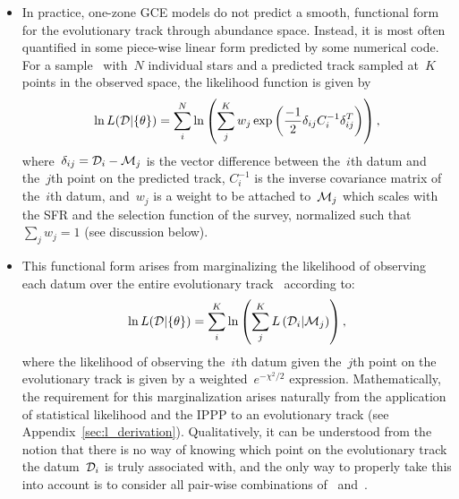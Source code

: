 \documentclass[ms.tex]{subfiles}
\begin{document}
\begin{itemize}
	\item In practice, one-zone GCE models do not predict a smooth, functional
	form for the evolutionary track through abundance space.
	Instead, it is most often quantified in some piece-wise linear form
	predicted by some numerical code.
	For a sample~ with~$N$ individual stars and a predicted track
	 sampled at~$K$ points in the observed space, the likelihood
	function is given by
	\begin{equation}
	\ln L(\mathcal{D} | \{\theta\}) = \sum_i^N \ln \left(
	\sum_j^K w_j \exp \left(
	\frac{-1}{2} \delta_{ij} C_i^{-1} \delta_{ij}^T
	\right)
	\right),
	\label{eq:likelihood}
	\end{equation}
	where~$\delta_{ij} = \mathcal{D}_i - \mathcal{M}_j$ is the vector difference
	between the~$i$th datum and the~$j$th point on the predicted track,
	$C_i^{-1}$ is the inverse covariance matrix of the~$i$th datum, and~$w_j$
	is a weight to be attached to~$\mathcal{M}_j$ which scales with the
	SFR and the selection function of the survey, normalized such that
	$\sum_j w_j = 1$ (see discussion below).

	\item This functional form arises from marginalizing the likelihood of
	observing each datum over the entire evolutionary track~
	according to:
	\begin{equation}
	\ln L(\mathcal{D} | \{\theta\}) = \sum_i^K \ln \left(
	\sum_j^K L\left(\mathcal{D}_i | \mathcal{M}_j
	\right)\right),
	\end{equation}
	where the likelihood of observing the~$i$th datum given the~$j$th point on
	the evolutionary track is given by a weighted~$e^{-\chi^2/2}$
	expression.
	Mathematically, the requirement for this marginalization arises naturally
	from the application of statistical likelihood and the IPPP to an
	evolutionary track (see Appendix~\ref{sec:l_derivation}).
	Qualitatively, it can be understood from the notion that there is no way
	of knowing which point on the evolutionary track the datum~$\mathcal{D}_i$
	is truly associated with, and the only way to properly take this into
	account is to consider all pair-wise combinations of~
	and~.


\end{itemize}
\end{document}
